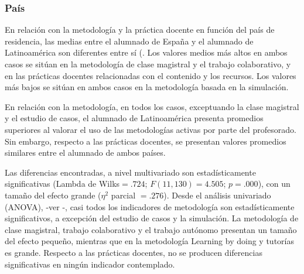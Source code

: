 \documentclass[spanish]{textolivre}
\begin{document}
\subsubsection{País}

En relación con la metodología y la práctica docente en función del país de residencia, las medias entre el alumnado de España y el alumnado de Latinoamérica son diferentes entre sí (. Los valores medios más altos en ambos casos se sitúan en la metodología de clase magistral y el trabajo colaborativo, y en las prácticas docentes relacionadas con el contenido y los recursos. Los valores más bajos se sitúan en ambos casos en la metodología basada en la simulación.  

En relación con la metodología, en todos los casos, exceptuando la clase magistral y el estudio de casos, el alumnado de Latinoamérica presenta promedios superiores al valorar el uso de las metodologías activas por parte del profesorado. Sin embargo, respecto a las prácticas docentes, se presentan valores promedios similares entre el alumnado de ambos países.  

Las diferencias encontradas, a nivel multivariado son estadísticamente significativas (Lambda de Wilks$=.724$; $F(11, 130)=4.505$; $p=.000$), con un tamaño del efecto grande ($\eta^2$ parcial $=.276$). Desde el análisis univariado (ANOVA), -ver -, casi todos los indicadores de metodología son estadísticamente significativos, a excepción del estudio de casos y la simulación. La metodología de clase magistral, trabajo colaborativo y el trabajo autónomo presentan un tamaño del efecto pequeño, mientras que en la metodología Learning by doing y tutorías es grande. Respecto a las prácticas docentes, no se producen diferencias significativas en ningún indicador contemplado.  
\end{document}
